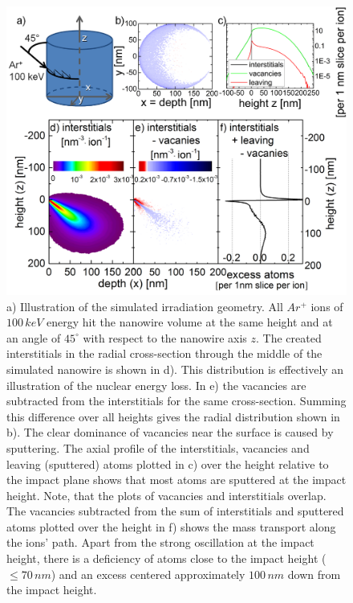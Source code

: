 \begin{figure}[h]
	\centering
		\includegraphics[width=.9\textwidth]{images/deformationBCA.jpg}
		\caption{a) Illustration of the simulated irradiation geometry. All $Ar^+$ ions of $100\,keV$ energy hit the nanowire volume at the same height and at an angle of $45^\circ$ with respect to the nanowire axis $z$. The created interstitials in the radial cross-section through the middle of the simulated nanowire is shown in d). This distribution is effectively an illustration of the nuclear energy loss. In e) the vacancies are subtracted from the interstitials for the same cross-section. Summing this difference over all heights gives the radial distribution shown in b). The clear dominance of vacancies near the surface is caused by sputtering. The axial profile of the interstitials, vacancies and leaving (sputtered) atoms plotted in c) over the height relative to the impact plane shows that most atoms are sputtered at the impact height. Note, that the plots of vacancies and interstitials overlap. The vacancies subtracted from the sum of interstitials and sputtered atoms plotted over the height in f) shows the mass transport along the ions' path. Apart from the strong oscillation at the impact height, there is a deficiency of atoms close to the impact height ($\le 70\,nm$) and an excess centered approximately $100\,nm$ down from the impact height.} 
	\label{deformationBCA}	
\end{figure}

